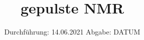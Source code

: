 



\subject{V49}  %
\title{gepulste NMR} %
\date{%
  Durchführung: 14.06.2021
  \hspace{3em}
  Abgabe: DATUM
}



\maketitle
\thispagestyle{empty}
\tableofcontents
\newpage







\printbibliography{}


